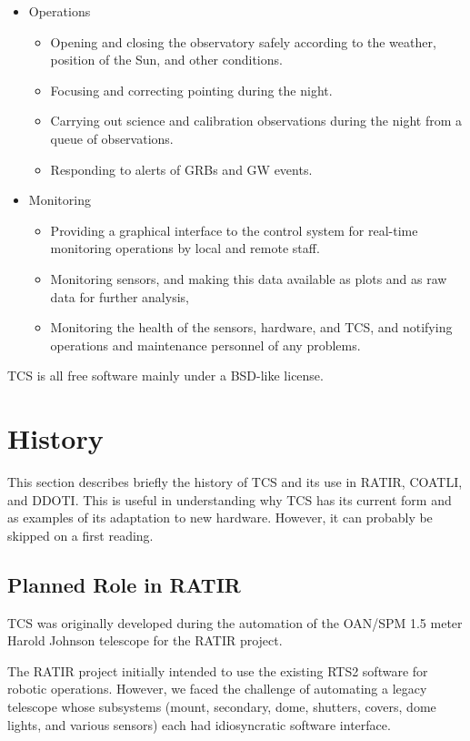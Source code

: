 \documentclass{article}
\begin{document}
\begin{itemize}
\item Operations
\begin{itemize}
\item
Opening and closing the observatory safely according to the weather, position of the Sun, and other conditions.
\item
Focusing and correcting pointing during the night.
\item
Carrying out science and calibration observations during the night from a queue of observations.
\item
Responding to alerts of GRBs and GW events.
\end{itemize}
\item Monitoring
\begin{itemize}
\item 
Providing a graphical interface to the control system for real-time monitoring operations by local and remote staff.
\item
Monitoring sensors, and making this data available as plots and as raw data for further analysis,
\item
Monitoring the health of the sensors, hardware, and TCS, and notifying operations and maintenance personnel of any problems.
\end{itemize}
\end{itemize}

TCS is all free software mainly under a BSD-like license.

\section{History}

This section describes briefly the history of TCS and its use in RATIR, COATLI, and DDOTI. This is useful in understanding why TCS has its current form and as examples of its adaptation to new hardware. However, it can probably be skipped on a first reading.

\subsection{Planned Role in RATIR}

TCS was originally developed during the automation of the OAN/SPM 1.5 meter Harold Johnson telescope for the RATIR project.

The RATIR project initially intended to use the existing RTS2 software for robotic operations. However, we faced the challenge of automating a legacy telescope whose subsystems (mount, secondary, dome, shutters, covers, dome lights, and various sensors) each had idiosyncratic software interface. 
\end{document}
